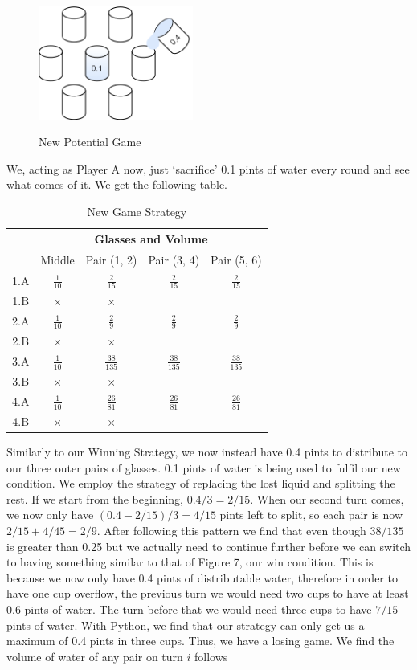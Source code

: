 \documentclass[11pt]{article}
\newcommand{\keywordfont}{\textsc}
\newcommand{\keyword}[1]{%
  \marginpar{\raggedright\small\keywordfont{#1}}}
\begin{document}
\begin{figure}[h]
   \centering
   \includegraphics[width=2in]{NewGame.png}
   \label{myfig}
   \caption{New Potential Game}
\end{figure}
We, acting as Player A now, just `sacrifice' 0.1 pints of water \keyword{Try} every round and see what comes of it. We get the following table. 
\begin{table}[h]
    \centering
    \renewcommand{\arraystretch}{1.3}
    \begin{tabular}{|c|c|c|c|c|} \hline 
 & \multicolumn{4}{|c|}{Glasses and Volume}\\ \hline 
         &  Middle&  Pair (1, 2)&  Pair (3, 4)&  Pair (5, 6)\\ \hline 
         1.A
&  $\frac{1}{10}$&  $\frac{2}{15}$&  $\frac{2}{15}$&  $\frac{2}{15}$\\ \hline 
         1.B
&  $\times$&  $\times$&  &  \\ \hline 
         2.A
&  $\frac{1}{10}$&  $\frac{ 2 }{ 9 }$&  $\frac{ 2 }{ 9 }$&  $\frac{ 2 }{ 9 }$\\ \hline 
         2.B
&  $\times$&  $\times$&  &  \\ \hline 
 3.A
& $\frac{1}{10}$& $\frac{ 38 }{ 135 }$& $\frac{ 38 }{ 135 }$&$\frac{ 38 }{ 135 }$\\ \hline 
 3.B
& $\times$& $\times$& &\\ \hline 
 4.A
& $\frac{1}{10}$& $\frac{ 26 }{ 81 }$& $\frac{ 26 }{ 81 }$&$\frac{ 26 }{ 81 }$\\ \hline 
 4.B& $\times$& $\times$& &\\ \hline
    \end{tabular}
    \caption{New Game Strategy}
    \label{tab:my_label}
\end{table}
Similarly to our Winning Strategy, we now instead have 0.4 pints to distribute to our three outer pairs of glasses. 0.1 pints of water is being used to fulfil our new condition. We employ the strategy of replacing the lost liquid and splitting the rest. If we start from the beginning, $0.4/3 = 2/15$. When our second turn comes, we now only have $(0.4 - 2/15)/3=4/15$ pints left to split, so each pair is now $2/15 + 4/45=2/9$.  After following this pattern we find that even though $38/135$ is greater than 0.25 but we actually need \keyword{Stuck} to continue further before we can switch to having something similar to that of Figure 7, our win condition. This is because we now only have 0.4 pints of distributable water, therefore in order to have one cup overflow, the previous turn we would need two cups to have at least 0.6 pints of water. The turn before that we would need three cups to have $7/15$ pints of water. With Python, we find that our strategy can only get us a maximum of 0.4 pints in three cups. Thus, we have a losing game. \keyword{AHA} We find the volume of water of any pair on turn $i$ follows
\end{document}
